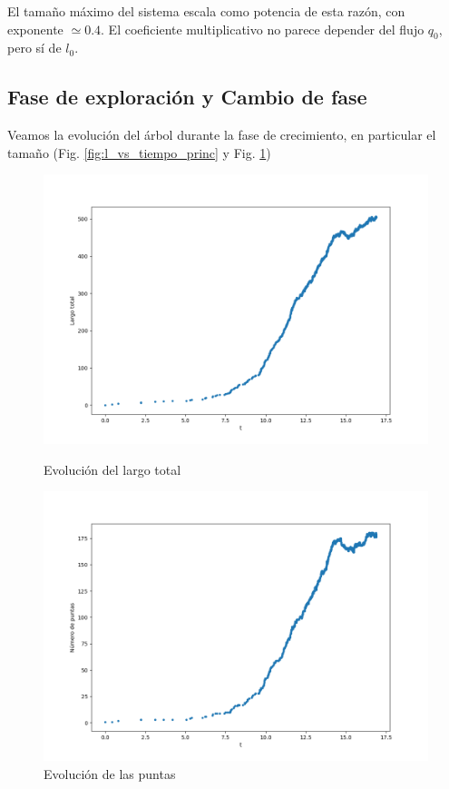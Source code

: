 \documentclass{article}
\begin{document}
El tamaño máximo del sistema escala como potencia de esta razón, con exponente $\simeq 0.4$. El coeficiente multiplicativo no parece depender del flujo $q_0$, pero sí de $l_0$.

\subsection{Fase de exploración y Cambio de fase}

Veamos la evolución del árbol durante la fase de crecimiento, en particular el tamaño (Fig. \ref{fig:l_vs_tiempo_princ} y Fig. \ref{fig:N_vs_tiempo_princ})

\begin{figure}[h!]
\begin{minipage}{0.5\textwidth}
    \centering
    \includegraphics[width=\textwidth]{graficos_inst/largo_vs_tiempo_principio.png}
    \caption[]{Evolución del largo total}
    \label{fig:l_vs_tiempo_princ}
\end{minipage} 
\begin{minipage}{0.5\textwidth}
    \centering
    \includegraphics[width=\textwidth]{graficos_inst/N_vs_tiempo_principio.png}
    \caption[]{Evolución de las puntas}
    \label{fig:N_vs_tiempo_princ}
\end{minipage}   
\end{figure}
\end{document}
